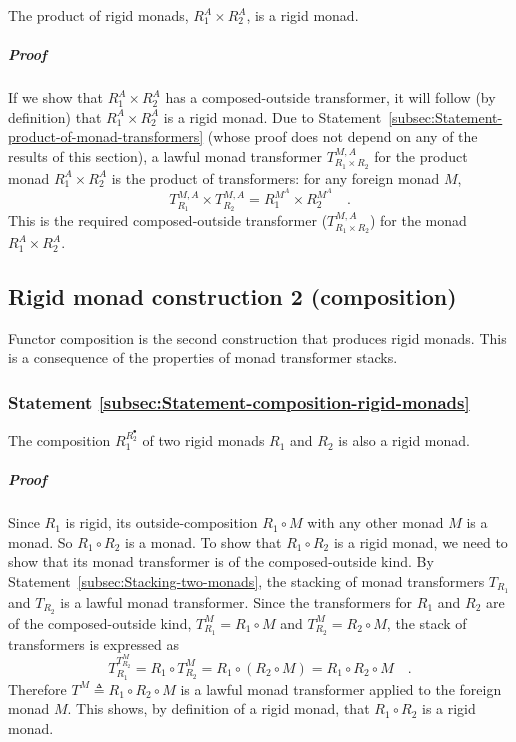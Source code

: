 The product of rigid monads, $R_{1}^{A}\times R_{2}^{A}$, is a rigid
monad.

\subparagraph{Proof}

If we show that $R_{1}^{A}\times R_{2}^{A}$ has a composed-outside
transformer, it will follow (by definition) that $R_{1}^{A}\times R_{2}^{A}$
is a rigid monad. Due to Statement~\ref{subsec:Statement-product-of-monad-transformers}
(whose proof does not depend on any of the results of this section),
a lawful monad transformer $T_{R_{1}\times R_{2}}^{M,A}$ for the
product monad $R_{1}^{A}\times R_{2}^{A}$ is the product of transformers:
for any foreign monad $M$,
\[
T_{R_{1}}^{M,A}\times T_{R_{2}}^{M,A}=R_{1}^{M^{A}}\times R_{2}^{M^{A}}\quad.
\]
This is the required composed-outside transformer ($T_{R_{1}\times R_{2}}^{M,A}$)
for the monad $R_{1}^{A}\times R_{2}^{A}$.

\subsection{Rigid monad construction 2 (composition)}

Functor composition is the second construction that produces rigid
monads. This is a consequence of the properties of monad transformer
stacks.

\subsubsection{Statement \label{subsec:Statement-composition-rigid-monads}\ref{subsec:Statement-composition-rigid-monads}}

The composition $R_{1}^{R_{2}^{\bullet}}$ of two rigid monads $R_{1}$
and $R_{2}$ is also a rigid monad.

\subparagraph{Proof}

Since $R_{1}$ is rigid, its outside-composition $R_{1}\circ M$ with
any other monad $M$ is a monad. So $R_{1}\circ R_{2}$ is a monad.
To show that $R_{1}\circ R_{2}$ is a rigid monad, we need to show
that its monad transformer is of the composed-outside kind. By Statement~\ref{subsec:Stacking-two-monads},
the stacking of monad transformers $T_{R_{1}}$and $T_{R_{2}}$ is
a lawful monad transformer. Since the transformers for $R_{1}$ and
$R_{2}$ are of the composed-outside kind, $T_{R_{1}}^{M}=R_{1}\circ M$
and $T_{R_{2}}^{M}=R_{2}\circ M$, the stack of transformers is expressed
as
\[
T_{R_{1}}^{T_{R_{2}}^{M}}=R_{1}\circ T_{R_{2}}^{M}=R_{1}\circ(R_{2}\circ M)=R_{1}\circ R_{2}\circ M\quad.
\]
Therefore $T^{M}\triangleq R_{1}\circ R_{2}\circ M$ is a lawful monad
transformer applied to the foreign monad $M$. This shows, by definition
of a rigid monad, that $R_{1}\circ R_{2}$ is a rigid monad.

